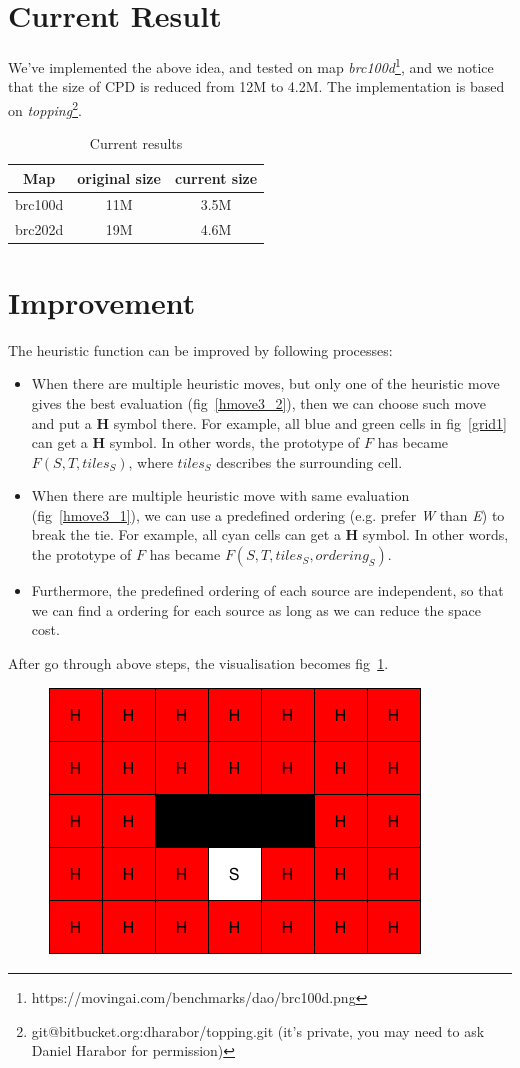 \documentclass{article}
\begin{document}
\section{Current Result}
We've implemented the above idea, and tested on map
\textit{brc100d}\footnote{https://movingai.com/benchmarks/dao/brc100d.png}, and we notice that
the size of CPD is reduced from 12M to 4.2M. The implementation is based on
\textit{topping}\footnote{git@bitbucket.org:dharabor/topping.git (it's private, you may need to ask Daniel
Harabor for permission)}.

\begin{table}[h]
  \centering
  \begin{tabular}{|c|c|c|}
  \hline
    Map       &   original size     &       current size \\
  \hline
    brc100d   &   11M               &       3.5M         \\
  \hline
    brc202d   &   19M               &       4.6M         \\
  \hline
  \end{tabular}
  \caption{Current results}
\end{table}

\section{Improvement}
The heuristic function can be improved by following processes:
\begin{itemize}
  \item When there are multiple heuristic moves, but only one of the heuristic
    move gives the best evaluation (fig~\ref{hmove3_2}), then we can choose such move and put a \textbf{H}
    symbol there. For example, all blue and green cells in fig~\ref{grid1} can get a \textbf{H} symbol.
    In other words, the prototype of $F$ has became $F(S, T, tiles_S)$, where
    $tiles_S$ describes the surrounding cell.

  \item When there are multiple heuristic move with same evaluation (fig~\ref{hmove3_1}), we
    can use a predefined ordering (e.g. prefer \textit{W} than \textit{E}) to break the tie. For example, all cyan cells can get
    a \textbf{H} symbol. In other words, the prototype of $F$ has became $F(S, T, tiles_S, ordering_S)$.

  \item Furthermore, the predefined ordering of each source are independent, so that we can
    find a ordering for each source as long as we can reduce the space cost.

\end{itemize}

After go through above steps, the visualisation becomes fig~\ref{grid2}.

\begin{figure}[t]
  \centering
  \includegraphics[width=.5\textwidth]{./grid2.png}
  \caption{}
  \label{grid2}
\end{figure}
\end{document}
